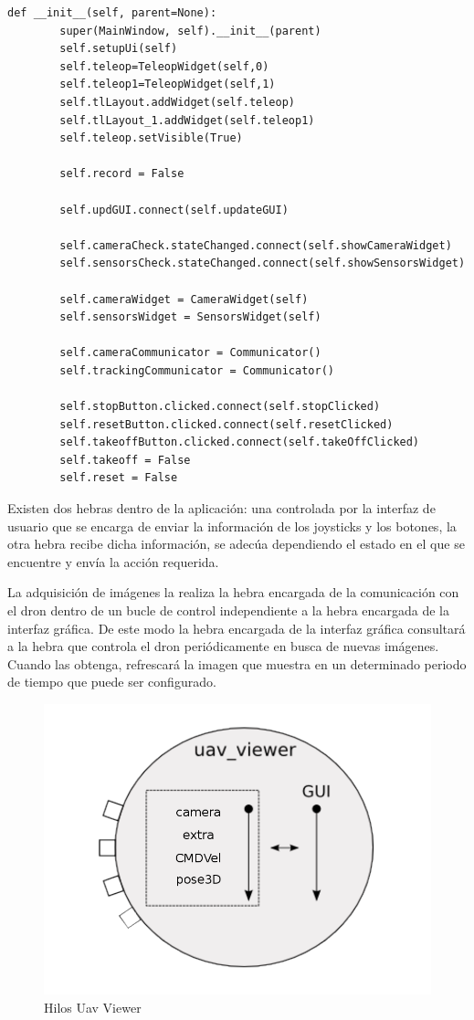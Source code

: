 \begin{lstlisting}[frame=single]
 def __init__(self, parent=None):
        super(MainWindow, self).__init__(parent)
        self.setupUi(self)
        self.teleop=TeleopWidget(self,0)
        self.teleop1=TeleopWidget(self,1)
        self.tlLayout.addWidget(self.teleop)
        self.tlLayout_1.addWidget(self.teleop1)
        self.teleop.setVisible(True)

        self.record = False

        self.updGUI.connect(self.updateGUI)

        self.cameraCheck.stateChanged.connect(self.showCameraWidget)
        self.sensorsCheck.stateChanged.connect(self.showSensorsWidget)

        self.cameraWidget = CameraWidget(self)
        self.sensorsWidget = SensorsWidget(self)

        self.cameraCommunicator = Communicator()
        self.trackingCommunicator = Communicator()

        self.stopButton.clicked.connect(self.stopClicked)
        self.resetButton.clicked.connect(self.resetClicked)
        self.takeoffButton.clicked.connect(self.takeOffClicked)
        self.takeoff = False
        self.reset = False
\end{lstlisting}

Existen dos hebras dentro de la aplicación: una controlada por la interfaz de usuario que se encarga de enviar la información de los joysticks y los botones, la otra hebra recibe dicha información, se adecúa dependiendo el estado en el que se encuentre y envía la acción requerida.

La adquisición de imágenes la realiza la hebra encargada de la comunicación con el dron dentro de un bucle de control independiente a la hebra encargada de la interfaz gráfica.  De este modo la hebra encargada de la interfaz gráfica consultará a la hebra que controla el dron periódicamente en busca de nuevas imágenes. Cuando las obtenga, refrescará la imagen que muestra en un determinado periodo de tiempo que puede ser configurado.

\begin{figure}[H]
  \centering
  \includegraphics[scale=0.3]{imagenes/uavViewer.png}
  \caption{Hilos Uav Viewer}
  \label{fig:uavViewer}
\end{figure}


